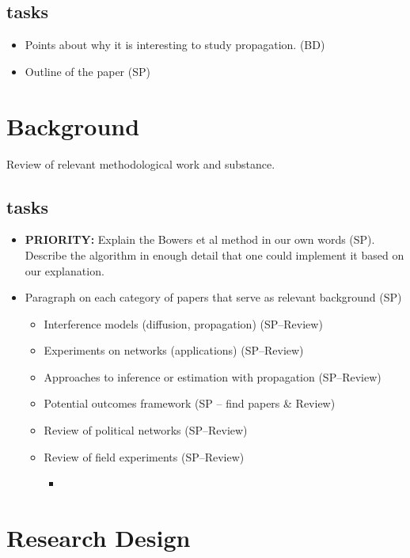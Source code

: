 \documentclass[12pt]{article}
\begin{document}
\subsection{tasks}
\begin{itemize}
\item Points about why it is interesting to study propagation. (BD)
\item Outline of the paper (SP)
\end{itemize}

\section{Background}

Review of relevant methodological work and substance.

\subsection{tasks}
\begin{itemize}
\item {\bf PRIORITY:} Explain the Bowers et al method in our own words (SP). Describe the algorithm in enough detail that one could implement it based on our explanation.
\item Paragraph on each category of papers that serve as relevant background (SP)
\begin{itemize}
\item Interference models (diffusion, propagation) (SP--Review)
\item  Experiments on networks (applications) (SP--Review)
\item Approaches to inference or estimation with propagation (SP--Review) 
\item Potential outcomes framework (SP -- find papers \& Review)
\item Review of political networks (SP--Review)
\item Review of field experiments (SP--Review)
\begin{itemize}
\item \citep{Gottlieb:2015,Alatas:2012,Kalla:2015, Malesky:2012,Ichino:2012,Nyhan:2014}
\end{itemize}
\end{itemize}
\end{itemize}


\section{Research Design}
\end{document}
